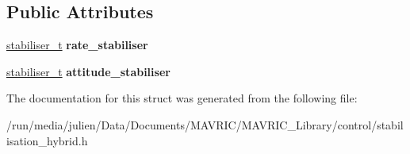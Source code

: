 \subsection*{Public Attributes}
\begin{DoxyCompactItemize}
\item 
\hypertarget{structStabiliser__Stack__hybrid__t_a58a399611fc69167e55b2e215f57b73d}{\hyperlink{structstabiliser__t}{stabiliser\+\_\+t} {\bfseries rate\+\_\+stabiliser}}\label{structStabiliser__Stack__hybrid__t_a58a399611fc69167e55b2e215f57b73d}

\item 
\hypertarget{structStabiliser__Stack__hybrid__t_a1259ee0502ca42fd4c08988fc7e0df0a}{\hyperlink{structstabiliser__t}{stabiliser\+\_\+t} {\bfseries attitude\+\_\+stabiliser}}\label{structStabiliser__Stack__hybrid__t_a1259ee0502ca42fd4c08988fc7e0df0a}

\end{DoxyCompactItemize}


The documentation for this struct was generated from the following file\+:\begin{DoxyCompactItemize}
\item 
/run/media/julien/\+Data/\+Documents/\+M\+A\+V\+R\+I\+C/\+M\+A\+V\+R\+I\+C\+\_\+\+Library/control/stabilisation\+\_\+hybrid.\+h\end{DoxyCompactItemize}
